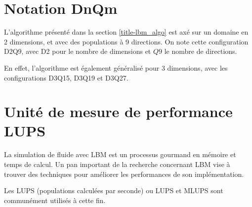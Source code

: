 \section{Notation DnQm}
L'algorithme présenté dans la section \ref{title-lbm_algo} est axé sur un domaine en 2 dimensions, et avec des populations à 9 directions. On note cette configuration D2Q9, avec D2 pour le nombre de dimensions et $Q9$ le nombre de directions. 

En effet, l'algorithme est également généralisé pour 3 dimensions, avec les configurations D3Q15, D3Q19 et D3Q27.

\section{Unité de mesure de performance LUPS}

La simulation de fluide avec \acs{LBM} est un processus gourmand en mémoire et temps de calcul. Un pan important de la recherche concernant \acs{LBM} vise à trouver des techniques pour améliorer les performances de son implémentation.

Les \acl{LUPS} (populations calculées par seconde) ou \acs{LUPS} et \ac{MLUPS} sont communément utilisés à cette fin.